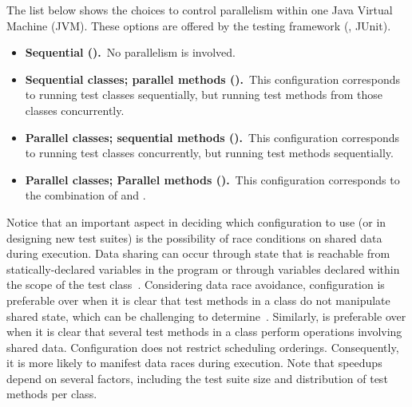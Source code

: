 The list below shows the choices to control parallelism within one
Java Virtual Machine (JVM).  These options are offered by the testing
framework (\eg{}, JUnit).

\begin{itemize}
\item
    \textbf{Sequential (\Seq).}~No parallelism is involved.
\item
    \textbf{Sequential classes; parallel methods
      (\SeqClassParMeth).}~This configuration corresponds to running
    test classes sequentially, but running test methods from those
    classes concurrently.
\item
    \textbf{Parallel classes; sequential methods
      (\ParClassSeqMeth{}).}~This configuration corresponds to running
    test classes concurrently, but running test methods sequentially.
\item
    \textbf{Parallel classes; Parallel methods
      (\ParClassParMeth).}~This configuration corresponds to the
    combination of \SeqClassParMeth{} and \ParClassSeqMeth{}.  
\end{itemize}


Notice that an important aspect in deciding which configuration to use
(or in designing new test suites) is the possibility of race
conditions on shared data during execution.  Data sharing can occur
through state that is reachable from statically-declared variables in
the program or through variables declared within the scope of the test
class~\cite{luo-etal-fse2014}.  Considering data race avoidance,
configuration \SeqClassParMeth{} is preferable over \ParClassSeqMeth{}
when it is clear that test methods in a class do not manipulate shared
state, which can be challenging to
determine~\cite{bell-etal-esecfse2015}.  Similarly, \ParClassSeqMeth{}
is preferable over \SeqClassParMeth{} when it is clear that several
test methods in a class perform operations involving shared data.
Configuration \ParClassParMeth{} does not restrict scheduling
orderings.  Consequently, it is more likely to manifest data races
during execution. Note that speedups depend on several factors,
including the test suite size and distribution of test methods per
class.

